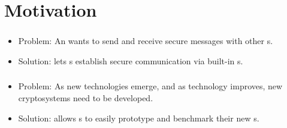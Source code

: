 
\section{Motivation}

\frame{\sectionpage}


\begin{frame} %
\frametitle{\eu}
\begin{itemize}
\item Problem: An \eu{} wants to send and receive
  secure messages with other \eu s.
\item Solution: \cry{} lets \eu s establish
  secure communication via built-in \cs s.
\end{itemize}
\end{frame}

\begin{frame}
\frametitle{\cg}
\begin{itemize}
\item Problem: As new technologies emerge, and as
  technology improves, new cryptosystems need to
  be developed.
\item Solution: \cry{} allows \cg s to easily prototype
  and benchmark their new \cs s.
\end{itemize}
\end{frame}

